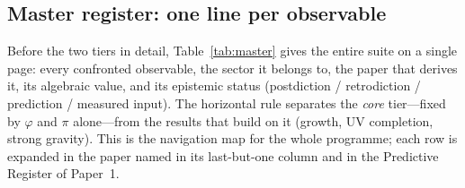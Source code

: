 \documentclass[aps,prd,preprint,amsmath,amssymb,nofootinbib,longbibliography]{revtex4-2}
\begin{document}
\subsection{Master register: one line per observable}
\label{sec:master-register}

Before the two tiers in detail, Table~\ref{tab:master} gives the entire suite
on a single page: every confronted observable, the sector it belongs to, the
paper that derives it, its algebraic value, and its epistemic status
(postdiction / retrodiction / prediction / measured input). The horizontal rule
separates the \emph{core} tier---fixed by $\varphi$ and $\pi$ alone---from the results that build on it (growth, UV completion, strong gravity). This is the navigation map for the whole programme; each row is expanded
in the paper named in its last-but-one column and in the Predictive Register of
Paper~1.
\end{document}
